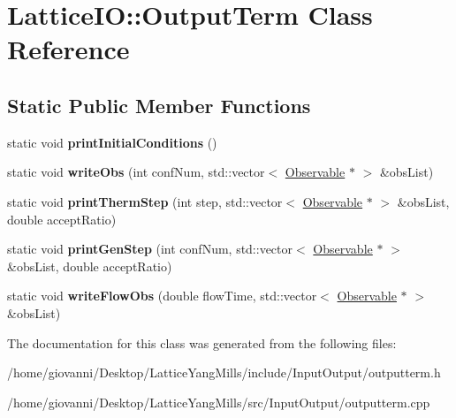 \hypertarget{classLatticeIO_1_1OutputTerm}{}\section{Lattice\+IO\+:\+:Output\+Term Class Reference}
\label{classLatticeIO_1_1OutputTerm}
\subsection*{Static Public Member Functions}
\begin{DoxyCompactItemize}
\item 
static void {\bfseries print\+Initial\+Conditions} ()\hypertarget{classLatticeIO_1_1OutputTerm_ab92340daa2c801b5275d67838df1450b}{}\label{classLatticeIO_1_1OutputTerm_ab92340daa2c801b5275d67838df1450b}

\item 
static void {\bfseries write\+Obs} (int conf\+Num, std\+::vector$<$ \hyperlink{classObservable}{Observable} $\ast$ $>$ \&obs\+List)\hypertarget{classLatticeIO_1_1OutputTerm_ab06002cace5e0450b9e618edfdb00d12}{}\label{classLatticeIO_1_1OutputTerm_ab06002cace5e0450b9e618edfdb00d12}

\item 
static void {\bfseries print\+Therm\+Step} (int step, std\+::vector$<$ \hyperlink{classObservable}{Observable} $\ast$ $>$ \&obs\+List, double accept\+Ratio)\hypertarget{classLatticeIO_1_1OutputTerm_aecda88f4a7724f1869fb40704d39ef58}{}\label{classLatticeIO_1_1OutputTerm_aecda88f4a7724f1869fb40704d39ef58}

\item 
static void {\bfseries print\+Gen\+Step} (int conf\+Num, std\+::vector$<$ \hyperlink{classObservable}{Observable} $\ast$ $>$ \&obs\+List, double accept\+Ratio)\hypertarget{classLatticeIO_1_1OutputTerm_a82d0d8fc4e4922df3c831c32a6802770}{}\label{classLatticeIO_1_1OutputTerm_a82d0d8fc4e4922df3c831c32a6802770}

\item 
static void {\bfseries write\+Flow\+Obs} (double flow\+Time, std\+::vector$<$ \hyperlink{classObservable}{Observable} $\ast$ $>$ \&obs\+List)\hypertarget{classLatticeIO_1_1OutputTerm_a4ba09f68c5cc215b03ca3aec47d76d65}{}\label{classLatticeIO_1_1OutputTerm_a4ba09f68c5cc215b03ca3aec47d76d65}

\end{DoxyCompactItemize}


The documentation for this class was generated from the following files\+:\begin{DoxyCompactItemize}
\item 
/home/giovanni/\+Desktop/\+Lattice\+Yang\+Mills/include/\+Input\+Output/outputterm.\+h\item 
/home/giovanni/\+Desktop/\+Lattice\+Yang\+Mills/src/\+Input\+Output/outputterm.\+cpp\end{DoxyCompactItemize}
